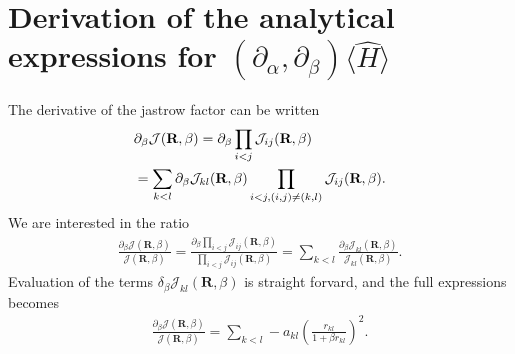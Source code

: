\documentclass[a4paper,10pt,twocolumn]{article} %
\newcommand{\ts}[1]{\textbf{#1}}
\newcommand{\expec}[1]{\langle{}{#1}\rangle{}}
\begin{document}
\begin{appendix}
\begin{algorithmic}
		\ENDFOR{}
		\ENDIF{}
	\ENDLOOP{}
\end{algorithmic}

\section{Derivation of the analytical expressions for $(\partial_\alpha,\partial_\beta)\expec{\hat H}$}%

The derivative of the jastrow factor can be written
\begin{align}
	&\partial_\beta \mathcal J(\ts R,\beta) =\partial_\beta \prod_{i<j} \mathcal J_{ij}(\ts R,\beta)\notag\\ 
	&= \sum_{k<l}\partial_\beta \mathcal J_{kl}(\ts R,\beta) 
		\prod_{
			i<j,
			(i,j)\neq(k,l) 
		}
	\mathcal J_{ij}(\ts R,\beta).
\end{align}
We are interested in the ratio
\begin{align}
	\frac{\partial_\beta\mathcal J(\ts R,\beta)}{\mathcal J(\ts R,\beta)}
	=\frac{\partial_\beta \prod_{i<j} \mathcal J_{ij}(\ts R,\beta) }
	{\prod_{i<j} \mathcal J_{ij}(\ts R,\beta)}
	= \sum_{k<l}\frac{\partial_\beta \mathcal J_{kl}(\ts R,\beta)}{\mathcal J_{kl}(\ts R,\beta)}.
\end{align}
Evaluation of the terms $\delta_\beta \mathcal J_{kl}(\ts R,\beta)$ is straight forvard, and the full expressions becomes
\begin{align}
	\frac{\partial_\beta\mathcal J(\ts R,\beta)}{\mathcal J(\ts R,\beta)}
	=	
	\sum_{k<l}-a_{kl}
	\left( 
		\frac {r_{kl}} {1+\beta r_{kl}}
	\right)^2.
\end{align}


\end{appendix}
\end{document}

